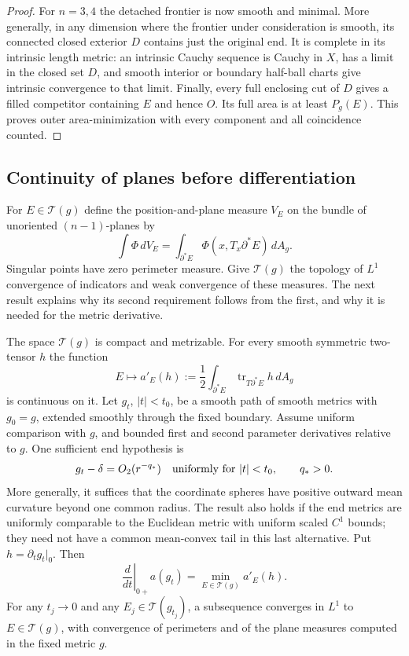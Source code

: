 \begin{proof}
For $n=3,4$ the detached frontier is now smooth and minimal. More
generally, in any dimension where the frontier under consideration
is smooth, its connected closed exterior $D$ contains just the original end. It is complete
in its intrinsic length metric: an intrinsic Cauchy sequence is
Cauchy in $X$, has a limit in the closed set $D$, and smooth interior
or boundary half-ball charts give intrinsic convergence to that
limit. Finally, every full enclosing cut of $D$ gives a filled
competitor containing $E$ and hence $O$. Its full area is at least
$P_g(E)$. This proves outer area-minimization with every component
and all coincidence counted.
\end{proof}

\subsection{Continuity of planes before differentiation}

For $E\in\mathcal T(g)$ define the position-and-plane measure $V_E$
on the bundle of unoriented $(n-1)$-planes by
\begin{equation}\label{q:geometry:plane-measure}
 \int\Phi\,dV_E=
 \int_{\partial^*E}\Phi(x,T_x\partial^*E)\,dA_g.
\end{equation}
Singular points have zero perimeter measure. Give $\mathcal T(g)$
the topology of $L^1$ convergence of indicators and weak convergence
of these measures. The next result explains why its second requirement
follows from the first, and why it is needed for the metric derivative.

\begin{proposition}
\label{q:geometry:envelope}
The space $\mathcal T(g)$ is compact and metrizable. For every smooth
symmetric two-tensor $h$ the function
\[
 E\longmapsto a'_E(h):=
 \frac12\int_{\partial^*E}\operatorname{tr}_{T\partial^*E}h\,dA_g
\]
is continuous on it.
Let $g_t$, $|t|<t_0$, be a smooth path of smooth metrics with $g_0=g$,
extended smoothly through the fixed boundary. Assume uniform
comparison with $g$, and bounded first and second parameter derivatives
relative to $g$. One sufficient end hypothesis is
\begin{equation}\label{q:geometry:uniform-AF}
 g_t-\delta=O_2(r^{-q_*})\quad\hbox{uniformly for }|t|<t_0,
 \qquad q_*>0.
\end{equation}
More generally, it suffices that the coordinate spheres have positive
outward mean curvature beyond one common radius. The result also
holds if the end metrics are uniformly comparable to the Euclidean
metric with uniform scaled $C^1$ bounds; they need not have a common
mean-convex tail in this last alternative. Put $h=\partial_tg_t|_0$. Then
\begin{equation}\label{q:geometry:envelope-derivative}
 \left.\frac{d}{dt}\right|_{0+}a(g_t)
       =\min_{E\in\mathcal T(g)}a'_E(h).
\end{equation}
For any $t_j\to0$ and any $E_j\in\mathcal T(g_{t_j})$, a subsequence
converges in $L^1$ to $E\in\mathcal T(g)$, with convergence of
perimeters and of the plane measures computed in the fixed metric $g$.
\end{proposition}

